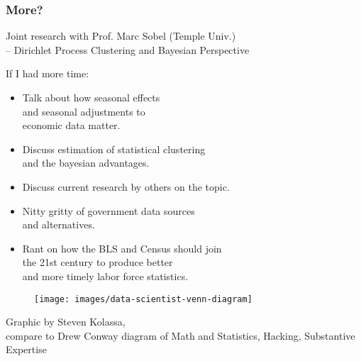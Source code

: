 \documentclass{beamer}
\begin{document}
\begin{frame}
	\frametitle{More?}
	
Joint research with Prof. Marc Sobel (Temple Univ.) \\
    -- Dirichlet Process Clustering and Bayesian Perspective  

\medskip
\medskip

If I had more time:
\begin{itemize}
	\item Talk about how seasonal effects\\
	 and seasonal adjustments to\\
	 economic data matter.  
	\item Discuss estimation of statistical clustering\\
	 and the bayesian advantages.
	\item Discuss current research by others on the topic.
	\item Nitty gritty of government data sources \\
	and alternatives.
	\item Rant on how the BLS and Census should join\\
	 the 21st century to produce better \\
	 and more timely labor force statistics.
\end{itemize}
			
\end{frame}

\begin{frame}
	
	\begin{figure}
		\centering
		\texttt{[image: images/data-scientist-venn-diagram]}
	\end{figure}

{\tiny 
Graphic by Steven Kolassa,\\   
compare to Drew Conway diagram of Math and Statistics, Hacking, Substantive Expertise
}
 
\end{frame}
		
\end{document}
